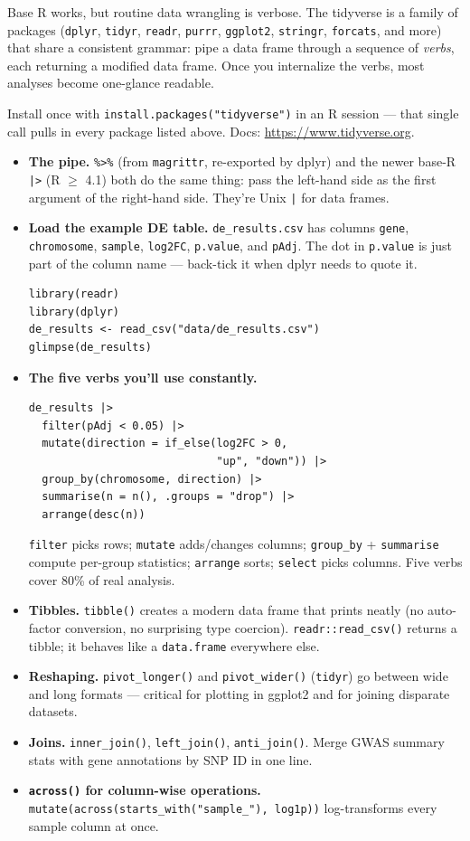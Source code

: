 Base R works, but routine data wrangling is verbose. The tidyverse is a family of packages (\texttt{dplyr}, \texttt{tidyr}, \texttt{readr}, \texttt{purrr}, \texttt{ggplot2}, \texttt{stringr}, \texttt{forcats}, and more) that share a consistent grammar: pipe a data frame through a sequence of \textit{verbs}, each returning a modified data frame. Once you internalize the verbs, most analyses become one-glance readable.

Install once with \texttt{install.packages("tidyverse")} in an R session --- that single call pulls in every package listed above. Docs: \url{https://www.tidyverse.org}.

\begin{itemize}[nosep]
  \item \textbf{The pipe.} \texttt{\%>\%} (from \texttt{magrittr}, re-exported by dplyr) and the newer base-R \texttt{|>} (R $\geq$ 4.1) both do the same thing: pass the left-hand side as the first argument of the right-hand side. They're Unix \texttt{|} for data frames.
  \item \textbf{Load the example DE table.} \texttt{de\_results.csv} has columns \texttt{gene}, \texttt{chromosome}, \texttt{sample}, \texttt{log2FC}, \texttt{p.value}, and \texttt{pAdj}. The dot in \texttt{p.value} is just part of the column name --- back-tick it when dplyr needs to quote it.
    \begin{lstlisting}
library(readr)
library(dplyr)
de_results <- read_csv("data/de_results.csv")
glimpse(de_results)
    \end{lstlisting}
  \item \textbf{The five verbs you'll use constantly.}
    \begin{lstlisting}
de_results |>
  filter(pAdj < 0.05) |>
  mutate(direction = if_else(log2FC > 0,
                             "up", "down")) |>
  group_by(chromosome, direction) |>
  summarise(n = n(), .groups = "drop") |>
  arrange(desc(n))
    \end{lstlisting}
    \texttt{filter} picks rows; \texttt{mutate} adds/changes columns; \texttt{group\_by} + \texttt{summarise} compute per-group statistics; \texttt{arrange} sorts; \texttt{select} picks columns. Five verbs cover 80\% of real analysis.
  \item \textbf{Tibbles.} \texttt{tibble()} creates a modern data frame that prints neatly (no auto-factor conversion, no surprising type coercion). \texttt{readr::read\_csv()} returns a tibble; it behaves like a \texttt{data.frame} everywhere else.
  \item \textbf{Reshaping.} \texttt{pivot\_longer()} and \texttt{pivot\_wider()} (\texttt{tidyr}) go between wide and long formats --- critical for plotting in ggplot2 and for joining disparate datasets.
  \item \textbf{Joins.} \texttt{inner\_join()}, \texttt{left\_join()}, \texttt{anti\_join()}. Merge GWAS summary stats with gene annotations by SNP ID in one line.
  \item \textbf{\texttt{across()} for column-wise operations.} \texttt{mutate(across(starts\_with("sample\_"), log1p))} log-transforms every sample column at once.
\end{itemize}
